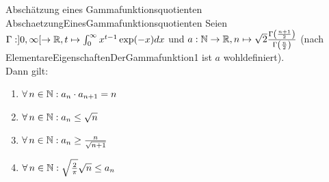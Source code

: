 \begin{lemma}{Abschätzung eines Gammafunktionsquotienten}
             {AbschaetzungEinesGammafunktionsquotienten}
Seien $\Gamma: ]0, \infty[ \rightarrow \mathbb{R}, 
             t \mapsto \int_0^\infty x^{t-1}\exp(-x)dx$ und
$a : \mathbb{N} \rightarrow \mathbb{R}, 
  n \mapsto \sqrt 2 \frac{\Gamma\left(\frac{n+1}2 \right)}
{\Gamma\left(\frac n 2 \right)}$
(nach~
{ElementareEigenschaftenDerGammafunktion1} ist $a$ wohldefiniert).\\
Dann gilt:
\begin{enumerate}[(1)]
\item\label{AbschaetzungEinesGammafunktionsquotienten1} 
 $\forall \, n \in \mathbb{N}: a_n\cdot a_{n+1} = n$
\item\label{AbschaetzungEinesGammafunktionsquotienten2}
 $\forall \, n \in \mathbb{N}: a_n \le \sqrt n$
\item\label{AbschaetzungEinesGammafunktionsquotienten3}
 $\forall \, n \in \mathbb{N}: a_n \ge \frac{n}{\sqrt{n+1}}$
 \item\label{AbschaetzungEinesGammafunktionsquotienten4}
 $\forall\, n \in \mathbb{N}: \sqrt{\frac 2 \pi} \sqrt n \le a_n$
\end{enumerate}
\end{lemma}
